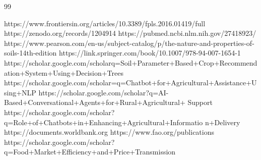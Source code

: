 \newpage
\begin{thebibliography}{99}

https://www.frontiersin.org/articles/10.3389/fpls.2016.01419/full
 https://zenodo.org/records/1204914
 https://pubmed.ncbi.nlm.nih.gov/27418923/
https://www.pearson.com/en-us/subject-catalog/p/the-nature-and-properties-of-soils-14th-edition
https://link.springer.com/book/10.1007/978-94-007-1654-1
https://scholar.google.com/scholarq=Soil+Parameter+Based+Crop+Recommendation+System+Using+Decision+Trees
https://scholar.google.com/scholar=q=Chatbot+for+Agricultural+Assistance+Using+NLP
https://scholar.google.com/scholar?q=AI- Based+Conversational+Agents+for+Rural+Agricultural+ Support
https://scholar.google.com/scholar?q=Role+of+Chatbots+in+Enhancing+Agricultural+Informatio
n+Delivery
https://documents.worldbank.org
https://www.fao.org/publications
https://scholar.google.com/scholar?q=Food+Market+Efficiency+and+Price+Transmission
\end{thebibliography}





